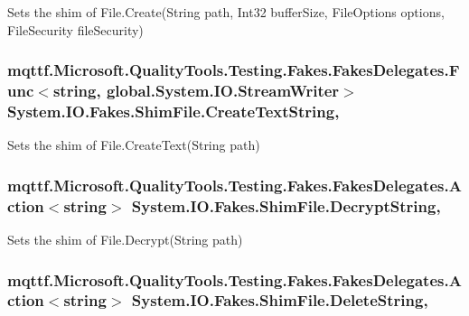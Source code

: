 Sets the shim of File.\-Create(\-String path, Int32 buffer\-Size, File\-Options options, File\-Security file\-Security)

\hypertarget{class_system_1_1_i_o_1_1_fakes_1_1_shim_file_a506223a5d78afc4b4cd8ecdaedf55076}{
\subsubsection[{Create\-Text\-String}]{\setlength{\rightskip}{0pt plus 5cm}mqttf.\-Microsoft.\-Quality\-Tools.\-Testing.\-Fakes.\-Fakes\-Delegates.\-Func$<$string, global.\-System.\-I\-O.\-Stream\-Writer$>$ System.\-I\-O.\-Fakes.\-Shim\-File.\-Create\-Text\-String\hspace{0.3cm}{\ttfamily [static]}, {\ttfamily [set]}}}\label{class_system_1_1_i_o_1_1_fakes_1_1_shim_file_a506223a5d78afc4b4cd8ecdaedf55076}


Sets the shim of File.\-Create\-Text(\-String path)

\hypertarget{class_system_1_1_i_o_1_1_fakes_1_1_shim_file_a2e80c411416c0fed37d2b66659927ba4}{
\subsubsection[{Decrypt\-String}]{\setlength{\rightskip}{0pt plus 5cm}mqttf.\-Microsoft.\-Quality\-Tools.\-Testing.\-Fakes.\-Fakes\-Delegates.\-Action$<$string$>$ System.\-I\-O.\-Fakes.\-Shim\-File.\-Decrypt\-String\hspace{0.3cm}{\ttfamily [static]}, {\ttfamily [set]}}}\label{class_system_1_1_i_o_1_1_fakes_1_1_shim_file_a2e80c411416c0fed37d2b66659927ba4}


Sets the shim of File.\-Decrypt(\-String path)

\hypertarget{class_system_1_1_i_o_1_1_fakes_1_1_shim_file_a5e7a39294adb6c2937a4736da0a22925}{
\subsubsection[{Delete\-String}]{\setlength{\rightskip}{0pt plus 5cm}mqttf.\-Microsoft.\-Quality\-Tools.\-Testing.\-Fakes.\-Fakes\-Delegates.\-Action$<$string$>$ System.\-I\-O.\-Fakes.\-Shim\-File.\-Delete\-String\hspace{0.3cm}{\ttfamily [static]}, {\ttfamily [set]}}}\label{class_system_1_1_i_o_1_1_fakes_1_1_shim_file_a5e7a39294adb6c2937a4736da0a22925}


